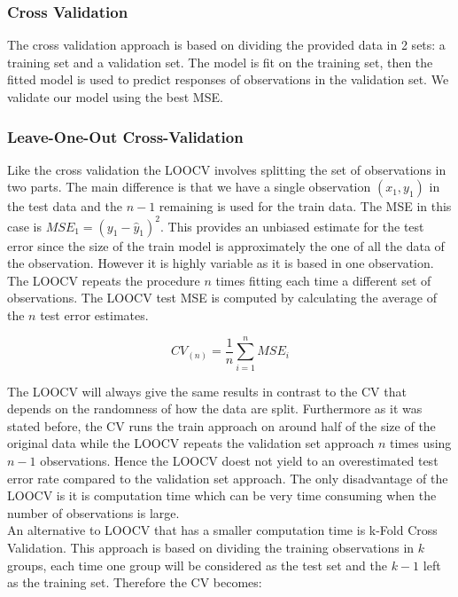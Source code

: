 \documentclass[]{report}
\begin{document}
\subsubsection{Cross Validation}
The cross validation approach is based on dividing the provided data in 2 sets: a training set and a validation set. The model is fit on the training set, then the fitted model is used to predict responses of observations in the validation set. We validate our model using the best MSE.

\subsubsection{Leave-One-Out Cross-Validation}
Like the cross validation the LOOCV involves splitting the set of observations in two parts. The main difference is that we have a single observation $(x_1, y_1)$ in the test data and the $n-1$ remaining is used for the train data. The MSE in this case is $MSE_1 =(y_1 - \hat{y}_{1})^{2}$. This provides an unbiased estimate for the test error since the size of the train model is approximately the one of all the data of the observation. However it is highly variable as it is based in one observation. The LOOCV repeats the procedure $n$ times fitting each time a different set of observations. The LOOCV test MSE is computed by calculating the average of the $n$ test error estimates.

\begin{center}
	$$CV_{(n)} = \frac{1}{n} \sum_{i=1}^{n} MSE_{i} $$
\end{center}

The LOOCV will always give the same results in contrast to the CV that depends on the randomness of how the data are split. Furthermore as it was stated before, the CV runs the train approach on around half of the size of the original data while the LOOCV repeats the validation set approach $n$ times using $n-1$ observations. Hence the LOOCV doest not yield to an overestimated test error rate compared to the validation set approach. The only disadvantage of the LOOCV is it is computation time which can be very time consuming when the number of observations is large.\\

An alternative to LOOCV that has a smaller computation time is k-Fold Cross Validation. This approach is based on dividing the training observations in $k$ groups, each time one group will be considered as the test set and the $k-1$ left as the training set. Therefore the CV becomes:
\end{document}

